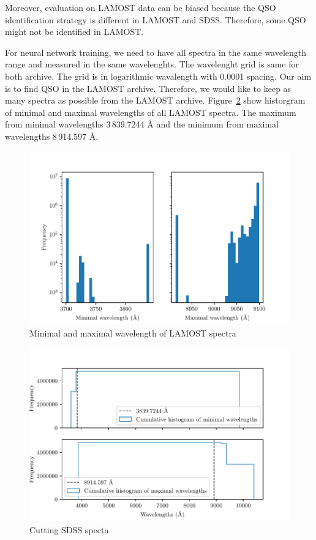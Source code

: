 Moreover, evaluation on LAMOST data can be biased
because the QSO identification strategy is different in LAMOST and SDSS.
Therefore, some QSO might not be identified in LAMOST.

For neural network training,
we need to have all spectra in the same wavelength range
and measured in the same wavelenghts.
The wavelenght grid is same for both archive.
The grid is in logarithmic wavalength with 0.0001 spacing.
Our aim is to find QSO in the LAMOST archive.
Therefore, we would like to keep as many spectra as possible from the LAMOST archive.
Figure~\ref{wavemin_wavemax_hist} show historgram of minimal and maximal wavelengths of all LAMOST spectra.
The maximum from minimal wavelengths 3\,839.7244 \AA{}
and the minimum from maximal wavelengths 8\,914.597 \AA{}.

\begin{figure}
	\includegraphics[width=\textwidth]{img/wavemin_wavemax_hist.pdf}
	\caption{Minimal and maximal wavelength of LAMOST spectra}
	\label{wavemin_wavemax_hist}
\end{figure}

\begin{figure}
	\includegraphics[width=\textwidth]{img/waves_cumulative_hist.pdf}
	\caption{Cutting SDSS specta}
	\label{wavemin_wavemax_hist}
\end{figure}

